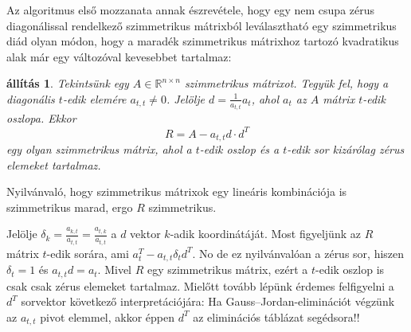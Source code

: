 \documentclass[a4paper, showtrims]{memoir}
\makeatletter
\renewenvironment{proof}[1][\proofname]
    {\par\pushQED{\qed}%
    \normalfont \topsep6\p@\@plus6\p@\relax
    \trivlist
    \item[\hskip\labelsep
        \itshape
    #1\@addpunct{:}]\ignorespaces}
    {\popQED\endtrivlist\@endpefalse}
\theoremstyle{plain}
\newtheorem{proposition}{állítás}[chapter]
\theoremstyle{remark}
\theoremstyle{definition}
\makeatother
\begin{document}
Az algoritmus első mozzanata annak észrevétele, 
hogy egy nem csupa zérus diagonálissal rendelkező szimmetrikus mátrixból leválasztható egy szimmetrikus diád olyan módon,
hogy a maradék szimmetrikus mátrixhoz tartozó kvadratikus alak már egy változóval kevesebbet tartalmaz:
\begin{proposition}
    Tekintsünk egy $A\in\mathbb{R}^{n\times n}$ szimmetrikus mátrixot.
    Tegyük fel, hogy a diagonális $t$-edik elemére $a_{t,t}\neq 0$.
    Jelölje $d=\frac{1}{a_{t,t}}a_t$, ahol $a_t$ az $A$ mátrix $t$-edik oszlopa.
    Ekkor
    \[
        R=A-a_{t,t}d\cdot d^T
   \]
   egy olyan szimmetrikus mátrix, 
   ahol a $t$-edik oszlop és a $t$-edik sor kizárólag zérus elemeket tartalmaz.
\end{proposition}
\begin{proof}
    Nyilvánvaló, hogy szimmetrikus mátrixok egy lineáris kombinációja is szimmetrikus marad, 
    ergo $R$ szimmetrikus.

    Jelölje $\delta_k=\frac{a_{k,t}}{a_{t,t}}=\frac{a_{t,k}}{a_{t,t}}$ a $d$ vektor $k$-adik koordinátáját.
    Most figyeljünk az $R$ mátrix $t$-edik sorára, ami
    $a_t^T-a_{t,t}\delta_t d^T$. No de ez nyilvánvalóan a zérus sor, 
    hiszen $\delta_t=1$ és $a_{t,t}d=a_t$.
    Mivel $R$ egy szimmetrikus mátrix, 
    ezért a $t$-edik oszlop is csak csak zérus elemeket tartalmaz.
    \end{proof}
    Mielőtt tovább lépünk érdemes felfigyelni a $d^T$ sorvektor következő interpretációjára:
    Ha Gauss--Jordan-eliminációt végzünk az $a_{t,t}$ pivot elemmel, akkor éppen $d^T$
    az eliminációs táblázat segédsora!!
\end{document}
